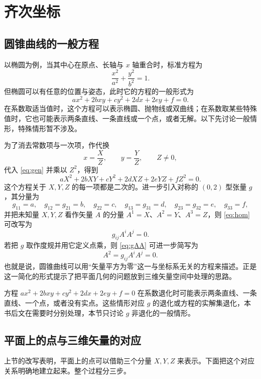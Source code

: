 \chapter{齐次坐标}

\section{圆锥曲线的一般方程}

以椭圆为例，当其中心在原点、长轴与 $x$ 轴重合时，标准方程为
\[
\frac{x^2}{a^2}+\frac{y^2}{b^2}=1 .
\]
但椭圆可以有任意的位置与姿态，此时它的方程的一般形式为
\begin{equation}\label{eq:gen}
ax^2+2bxy+cy^2+2dx+2ey+f=0 .
\end{equation}
在系数取适当值时，这个方程可以表示椭圆、抛物线或双曲线；在系数取某些特殊值时，它也可能表示两条直线、一条直线或一个点，或者无解。以下先讨论一般情形，特殊情形暂不涉及。

为了消去常数项与一次项，作代换
\[
x=\frac{X}{Z},\qquad y=\frac{Y}{Z},\qquad Z\neq 0,
\]
代入 \eqref{eq:gen} 并乘以 $Z^2$，得到
\begin{equation}\label{eq:hom}
aX^2+2bXY+cY^2+2dXZ+2eYZ+fZ^2=0 .
\end{equation}
这个方程关于 $X,Y,Z$ 的每一项都是二次的。进一步引入对称的 $(0,2)$ 型张量 $g$，其分量为
\[
g_{11}=a,\quad g_{12}=g_{21}=b,\quad g_{22}=c,\quad
g_{13}=g_{31}=d,\quad g_{23}=g_{32}=e,\quad g_{33}=f,
\]
并把未知量 $X,Y,Z$ 看作矢量 $A$ 的分量 $A^1=X$、$A^2=Y$、$A^3=Z$，则 \eqref{eq:hom} 可改写为
\begin{equation}\label{eq:gAA}
g_{ij}A^iA^j=0 .
\end{equation}
若把 $g$ 取作度规并用它定义点乘，则 \eqref{eq:gAA} 可进一步简写为
\[
A^2=g_{ij}A^iA^j=0 .
\]
也就是说，圆锥曲线可以用“矢量平方为零”这一与坐标系无关的方程来描述。正是这一简化的形式提示了把平面几何的问题放到三维矢量空间中处理的思路。

\begin{remark}
方程 $ax^2+2bxy+cy^2+2dx+2ey+f=0$ 在系数退化时可能表示两条直线、一条直线、一个点，或者没有实点。这些情形对应 $g$ 的退化或方程的实解集退化，本书后文在需要时分别处理，本节只讨论 $g$ 非退化的一般情形。
\end{remark}

\section{平面上的点与三维矢量的对应}

上节的改写表明，平面上的点可以借助三个分量 $X,Y,Z$ 来表示。下面把这个对应关系明确地建立起来。整个过程分三步。

